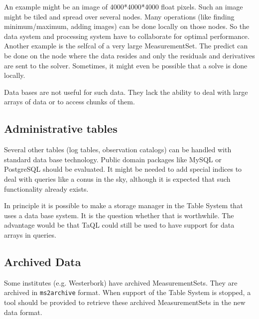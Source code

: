 An example might be an image of 4000*4000*4000 float pixels.
Such an image might be tiled and spread over several nodes.
Many operations (like finding minimum/maximum, adding images) can be
done locally on those nodes. So the data system and processing system
have to collaborate for optimal performance.
\\Another example is the selfcal of a very large MeasurementSet. The
predict can be done on the node where the data resides and only the
residuals and derivatives are sent to the solver. Sometimes, it might
even be possible that a solve is done locally.

Data bases are not useful for such data. They lack the ability to deal
with large arrays of data or to access chunks of them.

\subsection{Administrative tables}
Several other tables (log tables, observation catalogs) can be handled
with standard
data base technology. Public domain packages like MySQL or PostgreSQL
should be evaluated. It might be needed to add special indices
to deal with queries like a conus in the sky, although it is expected
that such functionality already exists.

In principle it is possible to make a storage manager in the Table
System that uses a data base system. It is the question whether that
is worthwhile. The advantage would be that TaQL could still be
used to have support for data arrays in queries.

\subsection {Archived Data}
Some institutes (e.g. Westerbork) have archived MeasurementSets.
They are archived in \texttt{ms2archive} format. When support of the
Table System is stopped, a tool should be provided to retrieve
these archived MeasurementSets in the new data format.
